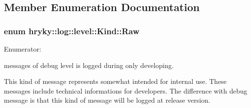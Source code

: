 \subsection{Member Enumeration Documentation}
\hypertarget{structhryky_1_1log_1_1level_1_1_kind_aa121006343f8971f566b5490b8001b21}{
\subsubsection[{Raw}]{\setlength{\rightskip}{0pt plus 5cm}enum {\bf hryky\-::log\-::level\-::\-Kind\-::\-Raw}}}\label{structhryky_1_1log_1_1level_1_1_kind_aa121006343f8971f566b5490b8001b21}
\begin{Desc}
\item[Enumerator\-: ]\par
\begin{description}
\item[{\em 
\hypertarget{structhryky_1_1log_1_1level_1_1_kind_aa121006343f8971f566b5490b8001b21ac0a8f52590796a1f311111dae15c6af8}{debug\-\_\-}\label{structhryky_1_1log_1_1level_1_1_kind_aa121006343f8971f566b5490b8001b21ac0a8f52590796a1f311111dae15c6af8}
}]messages of debug level is logged during only developing. \item[{\em 
\hypertarget{structhryky_1_1log_1_1level_1_1_kind_aa121006343f8971f566b5490b8001b21a101e156d0dbeb1bc9a4930fa365a5816}{info\-\_\-}\label{structhryky_1_1log_1_1level_1_1_kind_aa121006343f8971f566b5490b8001b21a101e156d0dbeb1bc9a4930fa365a5816}
}]This kind of message represents somewhat intended for internal use. These messages include technical informations for developers. The difference with debug message is that this kind of message will be logged at release version.


\end{description}
\end{Desc}
